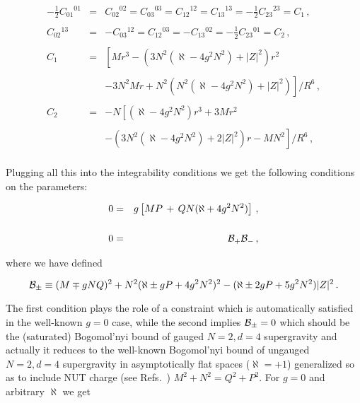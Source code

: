 \documentclass[12pt,a4paper]{article}
\begin{document}
\begin{equation}
\begin{array}{rcl}
-\frac{1}{2}C_{01}{}^{01} & = & C_{02}{}^{02} = C_{03}{}^{03} =
C_{12}{}^{12} =  C_{13}{}^{13} = -\frac{1}{2}C_{23}{}^{23} =   C_{1}\, ,\\
& & \\
C_{02}{}^{13} & = & -C_{03}{}^{12} = C_{12}{}^{03} = -C_{13}{}^{02}  = 
-\frac{1}{2}C_{23}{}^{01} =  C_{2}\, ,\\
& & \\
C_{1} & = & \left[Mr^{3} -\left(3N^{2}(\aleph-4g^{2}N^{2}) 
+|Z|^{2}\right)r^{2}\right.\\
& & \\
& & 
\left.
-3N^{2}Mr +N^{2}\left(N^{2}(\aleph-4g^{2}N^{2}) 
+|Z|^{2}\right)\right]/R^{6}\, ,\\
& & \\
C_{2} & = & -N\left[(\aleph-4g^{2}N^{2}) r^{3} +3Mr^{2}\right.\\
& & \\
& & 
\left.
-\left(3N^{2}(\aleph-4g^{2}N^{2}) +2|Z|^{2}\right)r -MN^{2}\right]/R^{6}\, ,\\
\end{array}
\end{equation}

Plugging all this into the integrability conditions we get the following 
conditions on the parameters:

\begin{eqnarray}
0 &=&  g\left[ MP \,+\, QN(\aleph +4g^2 N^2) \right] \, , \\
& & \nonumber \\
0 &=& {\cal B}_{+}{\cal B}_{-}\, ,\\
\end{eqnarray}

\noindent where we have defined

\begin{equation}
{\cal B}_{\pm} \equiv(M\mp gNQ)^2 +N^2 (\aleph \pm gP +4g^2 N^2 )^{2}
      -(\aleph \pm 2gP + 5 g^2 N^2 )|Z|^2\, .
\end{equation}

The first condition plays the role of a constraint which is
automatically satisfied in the well-known $g=0$ case, while the second
implies ${\cal B}_{\pm}=0$ which should be the (saturated) Bogomol'nyi
bound of gauged $N=2,d=4$ supergravity and actually it reduces to the
well-known Bogomol'nyi bound of ungauged $N=2,d=4$ supergravity in
asymptotically flat spaces ($\aleph=+1$) generalized so as to include
NUT charge (see Refs.~\cite{art:KKOT,art:BKO3,art:AMO})
$M^{2}+N^{2}=Q^{2}+P^{2}$. For $g=0$ and arbitrary $\aleph$ we get
\end{document}
